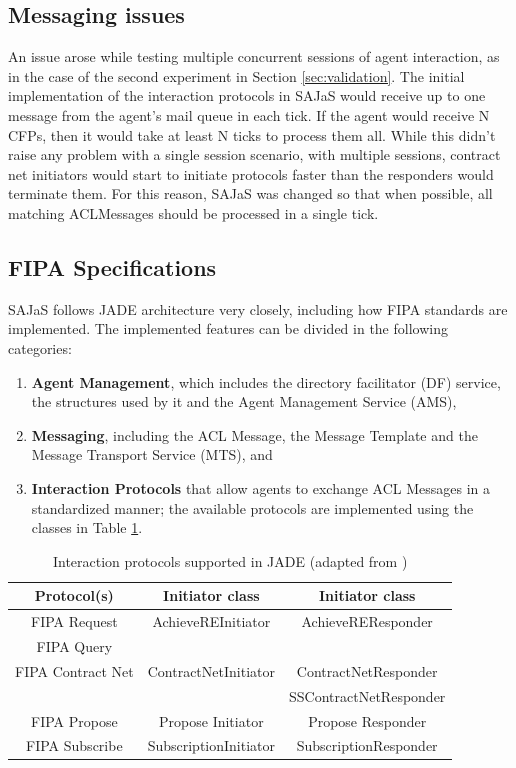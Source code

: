 \documentclass[a4paper,twoside]{article}
\begin{document}
\subsection{Messaging issues}
\label{sec:mess_issues}
An issue arose while testing multiple concurrent sessions of agent interaction, as in the case of the second experiment in Section \ref{sec:validation}. The initial implementation of the interaction protocols in SAJaS would receive up to one message from the agent's mail queue in each tick. If the agent would receive N CFPs, then it would take at least N ticks to process them all. While this didn't raise any problem with a single session scenario, with multiple sessions, contract net initiators would start to initiate protocols faster than the responders would terminate them. For this reason, SAJaS was changed so that when possible, all matching ACLMessages should be processed in a single tick.

\subsection{FIPA Specifications}
\label{sec:fipa-specifications}

SAJaS follows JADE architecture very closely, including how FIPA standards are implemented. The implemented features can be divided in the following categories:

\begin{enumerate}
  \item \textbf{Agent Management}, which includes the directory facilitator (DF) service, the structures used by it and the Agent Management Service (AMS),
  \item \textbf{Messaging}, including the ACL Message, the Message Template and the Message Transport Service (MTS), and
  \item \textbf{Interaction Protocols} that allow agents to exchange ACL Messages in a standardized manner; the available protocols are implemented using the classes in Table \ref{tab:fipa_protos}.
\end{enumerate}

\begin{table}[ht]
	\caption{Interaction protocols supported in JADE (adapted from \cite{bellifemine2007developing})}
	\label{tab:fipa_protos}
	\centering
		\begin{tabular}{c|c|c}
			\hline
			\textbf{Protocol(s)} & \textbf{Initiator class} & \textbf{Initiator class} \\
			\hline
			FIPA Request 	& AchieveREInitiator & AchieveREResponder\\
			FIPA Query 		& & \\
			\hline
			FIPA Contract Net & ContractNetInitiator & ContractNetResponder \\
			 &  & SSContractNetResponder \\
			\hline
			FIPA Propose & Propose Initiator & Propose Responder \\
			\hline 
			FIPA Subscribe & SubscriptionInitiator & SubscriptionResponder \\
			\hline
		\end{tabular}
\end{table}
\end{document}
